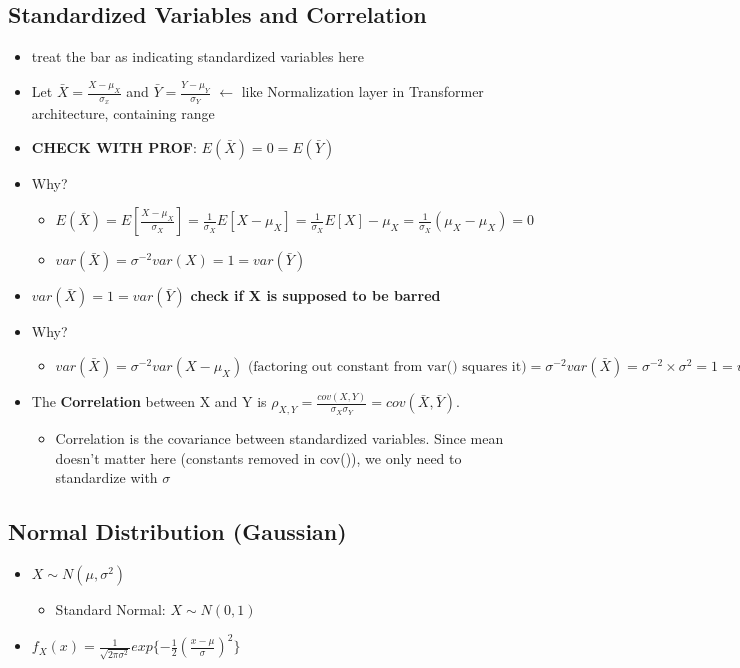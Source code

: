 \documentclass[10pt, oneside]{article}
\begin{document}
\subsection{Standardized Variables and Correlation}
\begin{itemize}
    \item treat the bar as indicating standardized variables here
    \item Let $\bar{X} = \frac{X-\mu_X}{\sigma_x}$ and $\bar{Y}
    =\frac{Y-\mu_Y}{\sigma_Y}$ $\leftarrow$ like Normalization layer in Transformer architecture, containing range
    \item \textbf{CHECK WITH PROF}: $E(\bar{X})=0=E(\bar{Y})$
    \item Why?
    \begin{itemize}
        \item $E(\bar X) = E[\frac{X-\mu_X}{\sigma_X}]=\frac{1}{\sigma_X}E[X-\mu_X]=\frac{1}{\sigma_X} E[X] -\mu_X=\frac{1}{\sigma_X}(\mu_X-\mu_X)=0$
        \item $var(\bar X) = \sigma ^{-2} var(X)=1=var(\bar Y)$
    \end{itemize}
    \item $var(\bar X) = 1= var(\bar Y)$ \textbf{check if X is supposed to be barred}
    \item Why?
    \begin{itemize}
        \item $var(\bar X)=\sigma^{-2} var(X-\mu_X) \text{ (factoring out constant from var() squares it)}=\sigma^{-2} var(\bar X)= \sigma^{-2} \times \sigma^2 = 1 = var(\bar Y)$
    \end{itemize}
    \item The \textbf{Correlation} between X and Y is $\rho_{X,Y}=\frac{cov(X,Y)}{\sigma_X \sigma_Y} = cov(\bar X, \bar Y)$. 
    \begin{itemize}
        \item Correlation is the covariance between standardized variables. Since mean doesn't matter here (constants removed in cov()), we only need to standardize with $\sigma$
    \end{itemize}
\end{itemize}
\subsection{Normal Distribution (Gaussian)}
\begin{itemize}
    \item $X \sim N(\mu,\sigma ^2)$
    \begin{itemize}
        \item Standard Normal: $X\sim N(0,1)$
    \end{itemize}
    \item $f_X(x)=\frac{1}{\sqrt{2\pi\sigma^2}}exp\{-\frac{1}{2}(\frac{x-\mu}{\sigma})^2\}$
\end{itemize}
\end{document}
